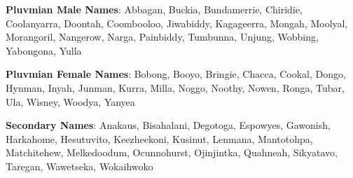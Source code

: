 \textbf{Pluvmian Male Names}: Abbagan, Buckia, Bundamerrie, Chiridie, Coolanyarra, Doontah, Coombooloo, Jiwabiddy, Kagageerra, Mongah, Moolyal, Morangoril, Nangerow, Narga, Painbiddy, Tumbunna, Unjung, Wobbing, Yabongona, Yulla

\textbf{Pluvmian Female Names}: Bobong, Booyo, Bringie, Chacca, Cookal, Dongo, Hynman, Inyah, Junman, Kurra, Milla, Noggo, Noothy, Nowen, Ronga, Tubar, Ula, Wisney, Woodya, Yanyea

\textbf{Secondary Names}: Anakaus, Bisahalani, Degotoga, Espowyes, Gawonish, Harkahome, Hesutuvito, Keezheekoni, Kusinut, Lenmana, Mantotohpa, Matchitehew, Melkedoodum, Ocunnohurst, Ojinjintka, Quahneah, Sikyatavo, Taregan, Wawetseka, Wokaihwoko
